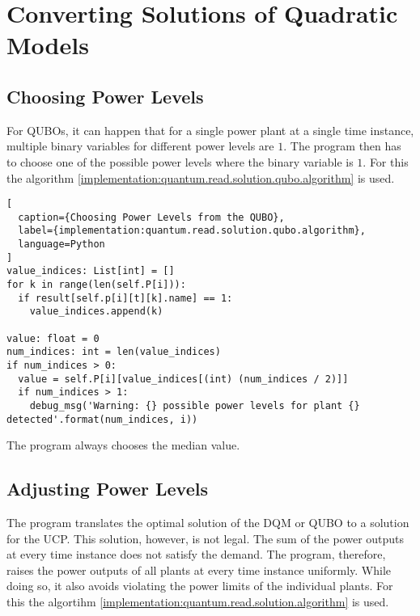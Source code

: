 \section{Converting Solutions of Quadratic Models}
\label{implementation:quantum.transform.solution}

\subsection{Choosing Power Levels}

For QUBOs, it can happen that for a single power plant at a single time instance, multiple binary variables for different power levels are $1$.
The program then has to choose one of the possible power levels where the binary variable is $1$.
For this the algorithm \ref{implementation:quantum.read.solution.qubo.algorithm} is used.

\begin{lstlisting}[
  caption={Choosing Power Levels from the QUBO},
  label={implementation:quantum.read.solution.qubo.algorithm},
  language=Python
]
value_indices: List[int] = []
for k in range(len(self.P[i])):
  if result[self.p[i][t][k].name] == 1:
    value_indices.append(k)

value: float = 0
num_indices: int = len(value_indices)
if num_indices > 0:
  value = self.P[i][value_indices[(int) (num_indices / 2)]]
  if num_indices > 1:
    debug_msg('Warning: {} possible power levels for plant {} detected'.format(num_indices, i))
\end{lstlisting}

The program always chooses the median value.

\subsection{Adjusting Power Levels}

The program translates the optimal solution of the DQM or QUBO to a solution for the UCP.
This solution, however, is not legal.
The sum of the power outputs at every time instance does not satisfy the demand.
The program, therefore, raises the power outputs of all plants at every time instance uniformly.
While doing so, it also avoids violating the power limits of the individual plants.
For this the algortihm \ref{implementation:quantum.read.solution.algorithm} is used.

